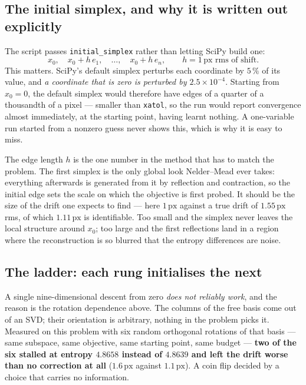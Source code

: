 \documentclass[11pt,a4paper]{article}
\newcommand{\px}{\,\text{px}}
\begin{document}
\subsection{The initial simplex, and why it is written out explicitly}

The script passes \texttt{initial\_simplex} rather than letting SciPy build
one:
\begin{equation}
  x_0,\quad x_0+h\,e_1,\quad\dots,\quad x_0+h\,e_n,
  \qquad h=1\px \text{ rms of shift}.
\end{equation}
This matters.  SciPy's default simplex perturbs each coordinate by $5\,\%$ of
its value, and \emph{a coordinate that is zero is perturbed by
$2.5\times10^{-4}$}.  Starting from $x_0=0$, the default simplex would
therefore have edges of a quarter of a thousandth of a pixel --- smaller than
\texttt{xatol}, so the run would report convergence almost immediately, at the
starting point, having learnt nothing.  A one-variable run started from a
nonzero guess never shows this, which is why it is easy to miss.

The edge length $h$ is the one number in the method that has to match the
problem.  The first simplex is the only global look Nelder--Mead ever takes:
everything afterwards is generated from it by reflection and contraction, so
the initial edge sets the scale on which the objective is first probed.  It
should be the size of the drift one expects to find --- here $1\px$ against a
true drift of $1.55\px$ rms, of which $1.11\px$ is identifiable.  Too small
and the simplex never leaves the local structure around $x_0$; too large and
the first reflections land in a region where the reconstruction is so blurred
that the entropy differences are noise.

\subsection{The ladder: each rung initialises the next}
\label{sec:ladder}

A single nine-dimensional descent from zero \emph{does not reliably work}, and
the reason is the rotation dependence above.  The columns of the free basis
come out of an SVD; their orientation is arbitrary, nothing in the problem
picks it.  Measured on this problem with six random orthogonal rotations of
that basis --- same subspace, same objective, same starting point, same budget
--- \textbf{two of the six stalled at entropy $4.8658$ instead of $4.8639$
and left the drift worse than no correction at all} ($1.6\px$ against
$1.1\px$).  A coin flip decided by a choice that carries no information.
\end{document}
